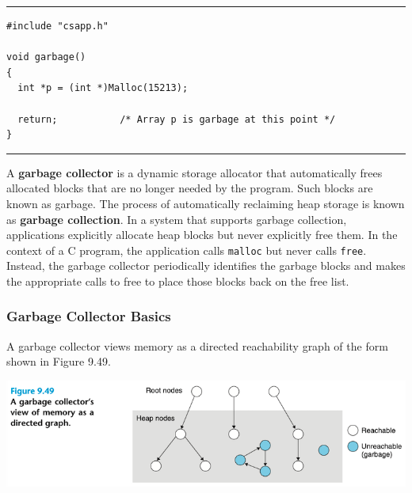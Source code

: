 \documentclass[11pt]{article}
\begin{document}
\noindent\rule{\textwidth}{0.5pt}
\begin{verbatim}
#include "csapp.h"

void garbage()
{
  int *p = (int *)Malloc(15213);

  return;			/* Array p is garbage at this point */
}

\end{verbatim}

\noindent\rule{\textwidth}{0.5pt}

A \textbf{garbage collector} is a dynamic storage allocator that automatically frees allocated blocks that are no longer needed by the program. Such blocks are known as garbage. The process of automatically reclaiming heap storage is known as \textbf{garbage collection}. In a system that supports garbage collection, applications explicitly allocate heap blocks but never explicitly free them. In the context of a C program, the application calls \texttt{malloc} but never calls \texttt{free}. Instead, the garbage collector periodically identifies the garbage blocks and makes the appropriate calls to free to place those blocks back on the free list.\\

\subsubsection{Garbage Collector Basics}
\label{sec:org0eff649}
A garbage collector views memory as a directed reachability graph of the form shown in Figure 9.49.\\

\begin{center}
\includegraphics[width=.9\linewidth]{pics/figure9.49-gc.png}
\end{center}
\end{document}
